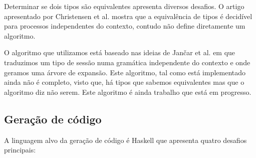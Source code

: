 Determinar se dois tipos são equivalentes apresenta diversos desafios. O artigo apresentado por Christensen et al. \cite{decidable-CFP-bisimilarity} mostra que a equivalência de tipos é decidível para processos independentes do contexto, contudo não define diretamente um algoritmo.

O algoritmo que utilizamos está baseado nas ideias de Jančar et al. \cite{bisimilarity} em que traduzimos um tipo de sessão numa gramática independente do contexto e onde geramos uma árvore de expansão. Este algoritmo, tal como está implementado ainda não é completo, visto que, há tipos que sabemos equivalentes mas que o algoritmo diz não serem. Este algoritmo é ainda trabalho que está em progresso.


\subsection{Geração de código}
A linguagem alvo da geração de código é Haskell que apresenta quatro desafios principais:

